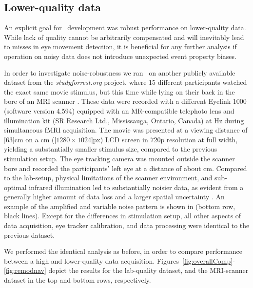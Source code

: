 \subsection*{Lower-quality data}\label{ana_3}

An explicit goal for \remodnav\ development was robust performance on
lower-quality data. While lack of quality cannot be arbitrarily compensated and
will inevitably lead to misses in eye movement detection, it is beneficial for
any further analysis if operation on noisy data does not introduce unexpected
event property biases.

In order to investigate noise-robustness we ran \remodnav\ on another
publicly available dataset from the \textit{studyforrest.org} project, where 15
different participants watched the exact same movie stimulus, but this time
while lying on their back in the bore of an MRI scanner \citep{Hanke2016}.
These data were recorded with a different Eyelink 1000 (software version 4.594)
equipped with an MR-compatible telephoto lens and illumination kit (SR Research
Ltd., Mississauga, Ontario, Canada) at \unit[1000]{Hz} during simultaneous fMRI
acquisition. The movie was presented at a viewing distance of \unit[$63$]{cm}
on a \unit[26]{cm} (\unit[$1280\times1024$]{px}) LCD screen in 720p resolution
at full width, yielding a substantially smaller stimulus size, compared to the
previous stimulation setup. The eye tracking camera was mounted outside the
scanner bore and recorded the participants' left eye at a distance of about
\unit[100]{cm}.  Compared to the lab-setup, physical limitations of the scanner
environment, and sub-optimal infrared illumination led to substantially
noisier data, as evident from a generally higher amount of data loss and a
larger spatial uncertainty \citep[Technical Validation]{Hanke2016}. An example
of the amplified and variable noise pattern is shown in  (bottom
row, black lines). Except for the differences in stimulation setup, all other
aspects of data acquisition, eye tracker calibration, and data processing
were identical to the previous dataset.

We performed the identical analysis as before, in order to compare performance
between a high and lower-quality data acquisition.
Figures~\ref{fig:overallComp}-\ref{fig:remodnav} depict the results for the
lab-quality dataset, and the MRI-scanner dataset in the top and bottom rows,
respectively.


